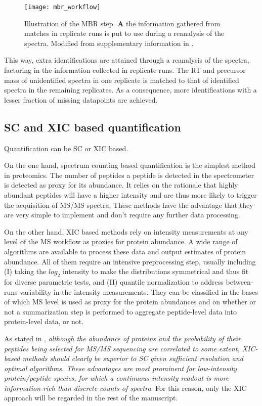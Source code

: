 \begin{figure}[!h]
\centering
\texttt{[image: mbr\_workflow]}
\caption{Illustration of the \ac{MBR} step. \textbf{A} the information gathered from matches in replicate runs is put to use during a reanalysis of the spectra. Modified from supplementary information in \cite{Argentini2016}.}
\label{figure:moff_mbr}
\end{figure}

This way, extra identifications are attained through a reanalysis of the spectra, factoring in the information collected in replicate runs. The RT and precursor mass of unidentified spectra in one replicate is matched to that of identified spectra in the remaining replicates. As a consequence, more identifications with a lesser fraction of missing datapoints are achieved.


\subsection{SC and XIC based quantification}
\label{subsec:scvsxic}


Quantification can be \ac{SC} or \ac{XIC} based.

On the one hand, spectrum counting based quantification is the simplest method in proteomics. The number of peptides a peptide is detected in the spectrometer is detected as proxy for its abundance. It relies on the rationale that highly abundant peptides will have a higher intensity and are thus more likely to trigger the acquisition of MS/MS spectra. These methods have the advantage that they are very simple to implement and don't require any further data processing.

On the other hand, \ac{XIC} based methods rely on intensity measurements at any level of the \ac{MS} workflow as proxies for protein abundance. A wide range of algorithms are available to process these data and output estimates of protein abundance. All of them require an intensive preprocessing step, usually including (I) taking the $log_2$ intensity to make the distributions symmetrical and thus fit for diverse parametric tests, and (II) quantile normalization to address between-runs variability in the intensity measurements. They can be classified in the bases of which MS level is used as proxy for the protein abundances and on whether or not a summarization step is performed to aggregate peptide-level data into protein-level data, or not. 


As stated in \cite{Cox2014}, \textit{although the abundance of proteins and the probability of their peptides being selected for \ac{MS/MS} sequencing are correlated to some extent, \ac{XIC}-based methods should clearly be superior to \ac{SC} given sufficient resolution and optimal algorithms. These advantages are most prominent for low-intensity protein/peptide species, for which a continuous intensity readout is more information-rich than discrete counts of spectra}. For this reason, only the \ac{XIC} approach will be regarded in the rest of the manuscript.  

